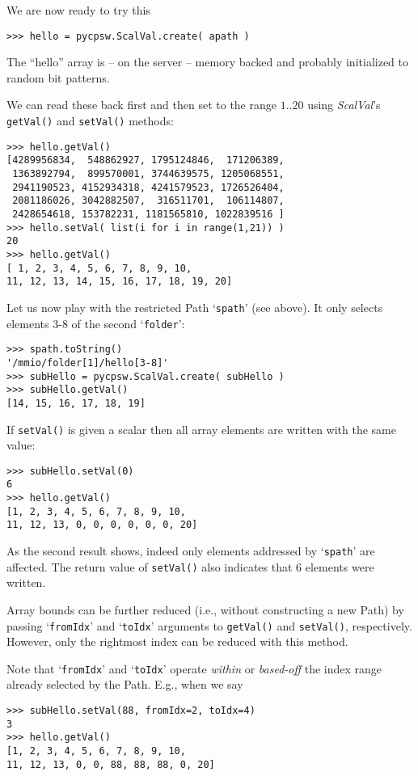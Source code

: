\documentclass[10pt]{article}
\newcommand{\Path}      {{Path}}
\newcommand{\cod}[1] {{\tt#1}}
\begin{document}
We are now ready to try this
\begin{verbatim}
>>> hello = pycpsw.ScalVal.create( apath )
\end{verbatim}
The ``hello'' array is -- on the server -- memory backed and probably initialized
to random bit patterns.

We can read these back first and then set to the range $1..20$ using {\em ScalVal}'s
\cod{getVal()} and \cod{setVal()} methods:
\begin{verbatim}
>>> hello.getVal()
[4289956834,  548862927, 1795124846,  171206389,
 1363892794,  899570001, 3744639575, 1205068551,
 2941190523, 4152934318, 4241579523, 1726526404,
 2081186026, 3042882507,  316511701,  106114807,
 2428654618, 153782231, 1181565810, 1022839516 ]
>>> hello.setVal( list(i for i in range(1,21)) )
20
>>> hello.getVal()
[ 1, 2, 3, 4, 5, 6, 7, 8, 9, 10,
11, 12, 13, 14, 15, 16, 17, 18, 19, 20]
\end{verbatim}

Let us now play with the restricted \Path{} `\cod{spath}' (see above).
It only selects elements 3-8 of the second `\cod{folder}':
\begin{verbatim}
>>> spath.toString()
'/mmio/folder[1]/hello[3-8]'
>>> subHello = pycpsw.ScalVal.create( subHello )
>>> subHello.getVal()
[14, 15, 16, 17, 18, 19]
\end{verbatim}

If \cod{setVal()} is given a scalar then all array elements are written
with the same value:
\begin{verbatim}
>>> subHello.setVal(0)
6
>>> hello.getVal()
[1, 2, 3, 4, 5, 6, 7, 8, 9, 10,
11, 12, 13, 0, 0, 0, 0, 0, 0, 20]
\end{verbatim}
As the second result shows, indeed only elements addressed by `\cod{spath}'
are affected. The return value of \cod{setVal()} also indicates that 6 elements
were written.

Array bounds can be further reduced (i.e., without constructing a new \Path{})
by passing `\cod{fromIdx}' and `\cod{toIdx}' arguments to \cod{getVal()} and
\cod{setVal()}, respectively.
However, only the rightmost index can be reduced with this method.

Note that `\cod{fromIdx}' and `\cod{toIdx}' operate {\em within} or {\em based-off}
the index range already selected by the \Path{}. E.g., when we say

\begin{verbatim}
>>> subHello.setVal(88, fromIdx=2, toIdx=4)
3
>>> hello.getVal()
[1, 2, 3, 4, 5, 6, 7, 8, 9, 10,
11, 12, 13, 0, 0, 88, 88, 88, 0, 20]
\end{verbatim}
\end{document}
